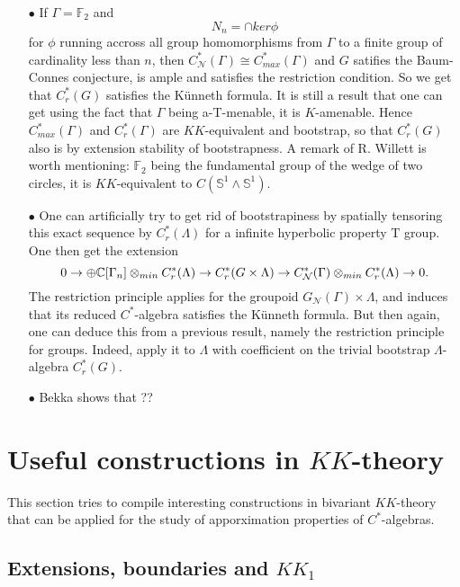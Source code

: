 \begin{itemize}
\item[$\bullet$] If $\Gamma= \mathbb F_2$ and 
\[N_n = \cap ker \phi \]
for $\phi$ running accross all group homomorphisms from $\Gamma$ to a finite group of cardinality less than $n$, then $C_{\mathcal N}^*(\Gamma) \cong C_{max}^*(\Gamma)$ and $G$ satifies the Baum-Connes conjecture, is ample and satisfies the restriction condition. So we get that $C_r^*(G)$ satisfies the Künneth formula. It is still a result that one can get using the fact that $\Gamma$ being a-T-menable, it is $K$-amenable. Hence $C^*_{max}(\Gamma)$ and $C_r^*(\Gamma)$ are $KK$-equivalent and bootstrap, so that $C_r^*(G)$ also is by extension stability of bootstrapness. A remark of R. Willett is worth mentioning: $\mathbb F_2$ being the fundamental group of the wedge of two circles, it is $KK$-equivalent to $C(\mathbb S^1 \wedge \mathbb S^1)$.\\
\item[$\bullet$] One can artificially try to get rid of bootstrapiness by spatially tensoring this exact sequence by $C_r^*(\Lambda)$ for a infinite hyperbolic property T group. One then get the extension
\[ 0 \rightarrow \oplus \mathbb C[\Gamma_n] \otimes_{min} C_r^*(\Lambda) \rightarrow C_r^*(G\times \Lambda) \rightarrow C^*_{\mathcal N} (\Gamma)\otimes_{min} C_r^*(\Lambda)   \rightarrow 0.\]
The restriction principle applies for the groupoid $G_{\mathcal N}(\Gamma)\times\Lambda$, and induces that its reduced $C^*$-algebra satisfies the Künneth formula. But then again, one can deduce this from a previous result, namely the restriction principle for groups. Indeed, apply it to $\Lambda$ with coefficient on the trivial bootstrap $\Lambda$-algebra $C_r^*(G)$.	\\ 
\item[$\bullet$] Bekka shows that ??
\end{itemize}

\section{Useful constructions in $KK$-theory}

This section tries to compile interesting constructions in bivariant $KK$-theory that can be applied for the study of apporximation properties of $C^*$-algebras.

\subsection*{Extensions, boundaries and $KK_1$}

